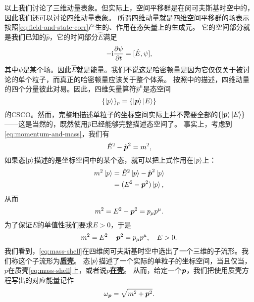 \documentclass[hyperref, UTF8, a4paper]{ctexart}
\newcommand*{\ii}{\mathrm{i}}
\renewcommand{\autoref}{\prettyref}
\newcommand{\concept}[1]{\underline{\textbf{#1}}}
\begin{document}
以上我们讨论了三维动量表象。但实际上，空间平移群是在闵可夫斯基时空中的，因此我们还可以讨论四维动量表象。
所谓四维动量就是四维空间平移群的场表示按照\eqref{eq:field-and-state-corr}产生的、作用在态矢量上的生成元。
它的空间部分就是我们已知的$\hat{p}$，它的时间部分$\hat{E}$满足
\[
    - \ii \pdv{\psi}{t} = [\hat{E}, \psi],
\]
其中$\psi$是某个场。因此$\hat{E}$就是能量。我们不说这是哈密顿量是因为它仅仅关于被讨论的单个粒子，而真正的哈密顿量应该关于整个体系。
按照\autoref{sec:translation}中的描述，四维动量的四个分量彼此对易。因此，四维矢量算符$\hat{p}^\mu$是态空间
\[
    \{\ket{p}\}_p = \{\ket{\vb*{p}} \ket{E}\}
\]
的CSCO。然而，完整地描述单粒子的坐标空间实际上并不需要全部的$\{\ket{\vb*{p}} \ket{E}\}$——这是当然的，既然使用$\hat{p}$已经能够完整描述态空间了。
事实上，考虑到\eqref{eq:momentum-and-mass}，我们有
\begin{equation}
    \hat{E}^2 - \hat{\vb*{p}}^2 = m^2,
\end{equation}
如果态$\ket{p}$描述的是坐标空间中的某个态，就可以把上式作用在$\ket{p}$上：
\[
    \begin{aligned}
        m^2 \ket{p} &= \hat{E}^2 \ket{p} - \hat{\vb*{p}}^2 \ket{p} \\
        &= (E^2 - \vb*{p}^2) \ket{p},
    \end{aligned}
\]
从而
\[
    m^2 = E^2 - \vb*{p}^2 = p_\mu p^\mu.
\]
为了保证$E$的单值性我们要求$E>0$，于是
\begin{equation}
    m^2 = E^2 - \vb*{p}^2 = p_\mu p^\mu, \quad E > 0.
    \label{eq:mass-shell}
\end{equation}
我们看到，\eqref{eq:mass-shell}在四维闵可夫斯基时空中选出了一个三维的子流形。我们称这个子流形为\concept{质壳}。
态$\ket{p}$描述了一个实际的单粒子的坐标空间，当且仅当，$p$在质壳\eqref{eq:mass-shell}上，或者说$p$\concept{在壳}。
从而，给定一个$\vb*{p}$，我们把使用质壳方程写出的对应能量记作
\begin{equation}
    \omega_{\vb*{p}} = \sqrt{ m^2 + \vb*{p}^2 }.
\end{equation}
\end{document}
